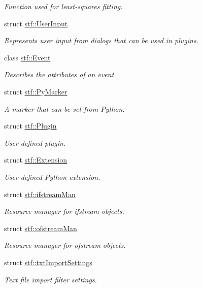 \begin{DoxyCompactItemize}
\begin{DoxyCompactList}\small\item\em Function used for least-\/squares fitting. \item\end{DoxyCompactList}\item 
struct \hyperlink{structstf_1_1UserInput}{stf::UserInput}
\begin{DoxyCompactList}\small\item\em Represents user input from dialogs that can be used in plugins. \item\end{DoxyCompactList}\item 
class \hyperlink{classstf_1_1Event}{stf::Event}
\begin{DoxyCompactList}\small\item\em Describes the attributes of an event. \item\end{DoxyCompactList}\item 
struct \hyperlink{structstf_1_1PyMarker}{stf::PyMarker}
\begin{DoxyCompactList}\small\item\em A marker that can be set from Python. \item\end{DoxyCompactList}\item 
struct \hyperlink{structstf_1_1Plugin}{stf::Plugin}
\begin{DoxyCompactList}\small\item\em User-\/defined plugin. \item\end{DoxyCompactList}\item 
struct \hyperlink{structstf_1_1Extension}{stf::Extension}
\begin{DoxyCompactList}\small\item\em User-\/defined Python extension. \item\end{DoxyCompactList}\item 
struct \hyperlink{structstf_1_1ifstreamMan}{stf::ifstreamMan}
\begin{DoxyCompactList}\small\item\em Resource manager for ifstream objects. \item\end{DoxyCompactList}\item 
struct \hyperlink{structstf_1_1ofstreamMan}{stf::ofstreamMan}
\begin{DoxyCompactList}\small\item\em Resource manager for ofstream objects. \item\end{DoxyCompactList}\item 
struct \hyperlink{structstf_1_1txtImportSettings}{stf::txtImportSettings}
\begin{DoxyCompactList}\small\item\em Text file import filter settings. \item\end{DoxyCompactList}\end{DoxyCompactItemize}
